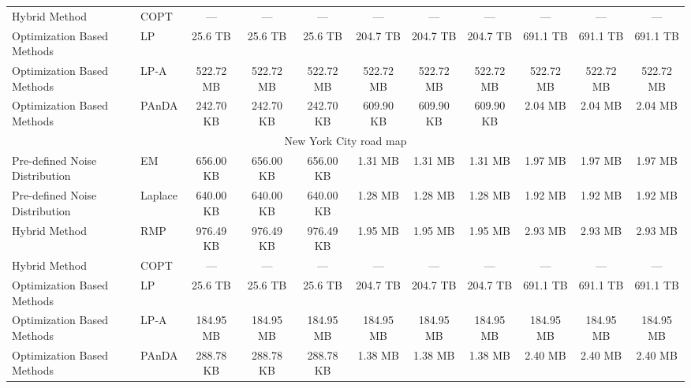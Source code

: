 \begin{table}[t]
{\begin{tabular}{ll|ccc|ccc|ccc}
Hybrid Method & COPT & --- & --- & --- & --- & --- & --- & --- & --- & --- \\
Optimization Based Methods & LP & 25.6 TB & 25.6 TB & 25.6 TB & 204.7 TB & 204.7 TB & 204.7 TB & 691.1 TB & 691.1 TB & 691.1 TB \\
Optimization Based Methods & LP-A & 522.72 MB & 522.72 MB & 522.72 MB & 522.72 MB & 522.72 MB & 522.72 MB & 522.72 MB & 522.72 MB & 522.72 MB \\
Optimization Based Methods & PAnDA & 242.70 KB & 242.70 KB & 242.70 KB & 609.90 KB & 609.90 KB & 609.90 KB & 2.04 MB & 2.04 MB & 2.04 MB \\
\hline
\multicolumn{11}{c}{New York City road map} \\
\hline
Pre-defined Noise Distribution & EM & 656.00 KB & 656.00 KB & 656.00 KB & 1.31 MB & 1.31 MB & 1.31 MB & 1.97 MB & 1.97 MB & 1.97 MB \\
Pre-defined Noise Distribution & Laplace & 640.00 KB & 640.00 KB & 640.00 KB & 1.28 MB & 1.28 MB & 1.28 MB & 1.92 MB & 1.92 MB & 1.92 MB \\
Hybrid Method & RMP & 976.49 KB & 976.49 KB & 976.49 KB & 1.95 MB & 1.95 MB & 1.95 MB & 2.93 MB & 2.93 MB & 2.93 MB \\
Hybrid Method & COPT & --- & --- & --- & --- & --- & --- & --- & --- & --- \\
Optimization Based Methods & LP & 25.6 TB & 25.6 TB & 25.6 TB & 204.7 TB & 204.7 TB & 204.7 TB & 691.1 TB & 691.1 TB & 691.1 TB \\
Optimization Based Methods & LP-A & 184.95 MB & 184.95 MB & 184.95 MB & 184.95 MB & 184.95 MB & 184.95 MB & 184.95 MB & 184.95 MB & 184.95 MB \\
Optimization Based Methods & PAnDA & 288.78 KB & 288.78 KB & 288.78 KB & 1.38 MB & 1.38 MB & 1.38 MB & 2.40 MB & 2.40 MB & 2.40 MB \\
\hline
\end{tabular}%
}
\end{table}
